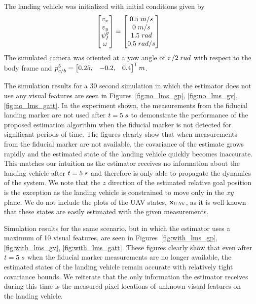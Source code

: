 The landing vehicle was initialized with initial conditions given by
\begin{equation}
  \begin{bmatrix}
    v_x \\
    v_y \\
    \psi_I^g \\
    \omega
  \end{bmatrix}
  =
  \begin{bmatrix}
    0.5 \hphantom{\cdot} m/s \\
    0 \hphantom{\cdot} m/s \\
    1.5 \hphantom{\cdot} rad \\
    0.5 \hphantom{\cdot} rad/s
  \end{bmatrix}
\end{equation}
The 
simulated camera was oriented at a yaw angle of $\pi/2 \hphantom{\cdot} rad$ with respect to the body
frame and $p_{c/b}^b = \begin{bmatrix}0.25, & -0.2, &
0.4 \end{bmatrix}^{\mathsf{T}} m$.

The simulation results for a 30 second simulation in which the estimator does
not use any visual features are seen in
Figures~\ref{fig:no_lms_gp}, \ref{fig:no_lms_gv}, \ref{fig:no_lms_gatt}. In the
experiment shown, the measurements from the fiducial landing marker are not used
after $t = 5 \hphantom{\cdot} s$ to demonstrate the performance of the proposed
estimation algorithm when the fiducial marker is not detected for significant
periods of time. The figures clearly show that when measurements from the
fiducial marker are not available, the covariance of the estimate grows rapidly
and the estimated state of the landing vehicle quickly becomes inaccurate. This
matches our intuition as the estimator receives no information about the landing
vehicle after $t = 5 \hphantom{\cdot} s$ and therefore is only able to propagate
the dynamics of the system. We note that the $z$ direction of the estimated
relative goal position is the exception as the landing vehicle is constrained to
move only in the $xy$ plane. We do not include the plots of the UAV states,
$\boldsymbol{\mathrm{x}}_{\text{UAV}}$, as it is well known that these states are easily
estimated with the given measurements.

Simulation results for the same scenario, but in which the estimator uses a
maximum of 10 visual features, are seen in
Figures~\ref{fig:with_lms_gp}, \ref{fig:with_lms_gv}, \ref{fig:with_lms_gatt}.
These figures clearly show that even after $t = 5 \hphantom{\cdot} s$ when the
fiducial marker measurements are no longer available, the estimated states of
the landing vehicle remain accurate with relatively tight covariance bounds. We
reiterate that the only information the estimator receives during this time is
the measured pixel locations of unknown visual features on the landing vehicle.

